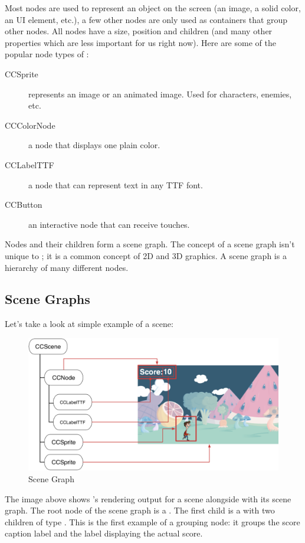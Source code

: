 Most nodes are used to represent an object on the screen (an image, a solid
color, an UI element, etc.), a few other nodes are only used as containers that
group other nodes. All nodes have a size, position and children (and many other properties
which are less important for us right now). Here are some of the popular
node types of \cocos{}:

\begin{description}
  \item[CCSprite] represents an image or an animated image. Used for characters,
  enemies, etc.
  \item[CCColorNode] a node that displays one plain color.
  \item[CCLabelTTF] a node that can represent text in any TTF font.
  \item[CCButton] an interactive node that can receive touches.
\end{description}

Nodes and their children form a scene graph. The concept of a scene graph isn't
unique to \cocos{}; it is a common concept of 2D and 3D graphics. A scene graph
is a hierarchy of many different nodes. 

\subsection{Scene Graphs}
Let's take a look at simple example of a \cocos{} scene:

\begin{figure}[H]
		\centering
		\includegraphics[width=0.9\linewidth]{images/cocos2d/SceneGraph.png}     
		\caption{\cocos{} Scene Graph}
\end{figure}

The image above shows \cocos{}'s rendering output for a scene alongside with
its scene graph. The root node of the scene graph is a \ccscene{}. The first
child is a \ccnode{} with two children of type \cclabel{}. This \ccnode{} is the first example of a grouping node: it groups the score caption
label and the label displaying the actual score. 

